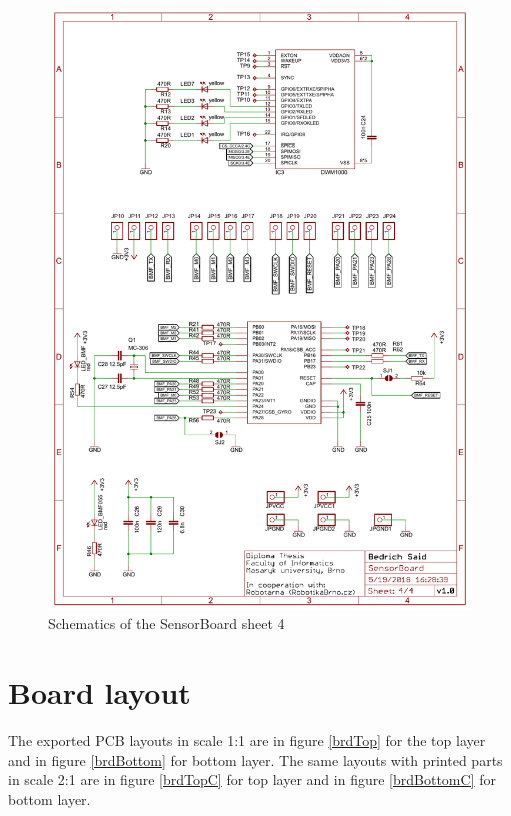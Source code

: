\begin{figure}
	\centering
	\includegraphics[width=\linewidth]{img/sch4.pdf}
	\caption{Schematics of the SensorBoard sheet 4}
	\label{sch4}
\end{figure}

\section{Board layout}
The exported \ac{PCB} layouts in scale 1:1 are in figure \ref{brdTop} for the top layer and in figure \ref{brdBottom} for bottom layer. The same layouts with printed parts in scale 2:1 are in figure \ref{brdTopC} for top layer and in figure \ref{brdBottomC} for bottom layer.

